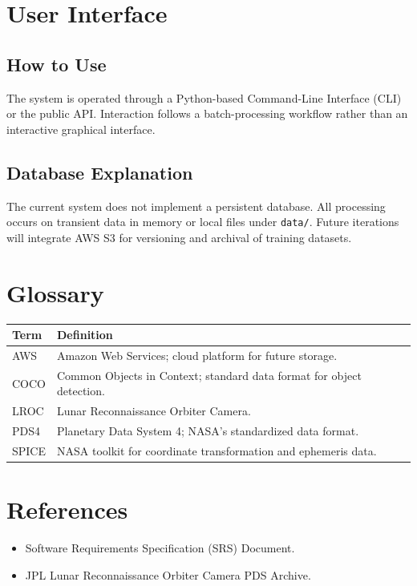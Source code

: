 \documentclass[12pt]{article}
\begin{document}
\section{User Interface}
\subsection{How to Use}
The system is operated through a Python-based Command-Line Interface (CLI) or the public API. Interaction follows a batch-processing workflow rather than an interactive graphical interface.

\subsection{Database Explanation}
The current system does not implement a persistent database. All processing occurs on transient data in memory or local files under \texttt{data/}. Future iterations will integrate AWS S3 for versioning and archival of training datasets.

\section{Glossary}
\begin{tabularx}{\textwidth}{l|X}
\toprule
\textbf{Term} & \textbf{Definition} \\ \midrule
AWS & Amazon Web Services; cloud platform for future storage. \\
COCO & Common Objects in Context; standard data format for object detection. \\
LROC & Lunar Reconnaissance Orbiter Camera. \\
PDS4 & Planetary Data System 4; NASA's standardized data format. \\
SPICE & NASA toolkit for coordinate transformation and ephemeris data. \\
\bottomrule
\end{tabularx}

\section{References}
\begin{itemize}
    \item Software Requirements Specification (SRS) Document.
    \item JPL Lunar Reconnaissance Orbiter Camera PDS Archive.
\end{itemize}
\end{document}
